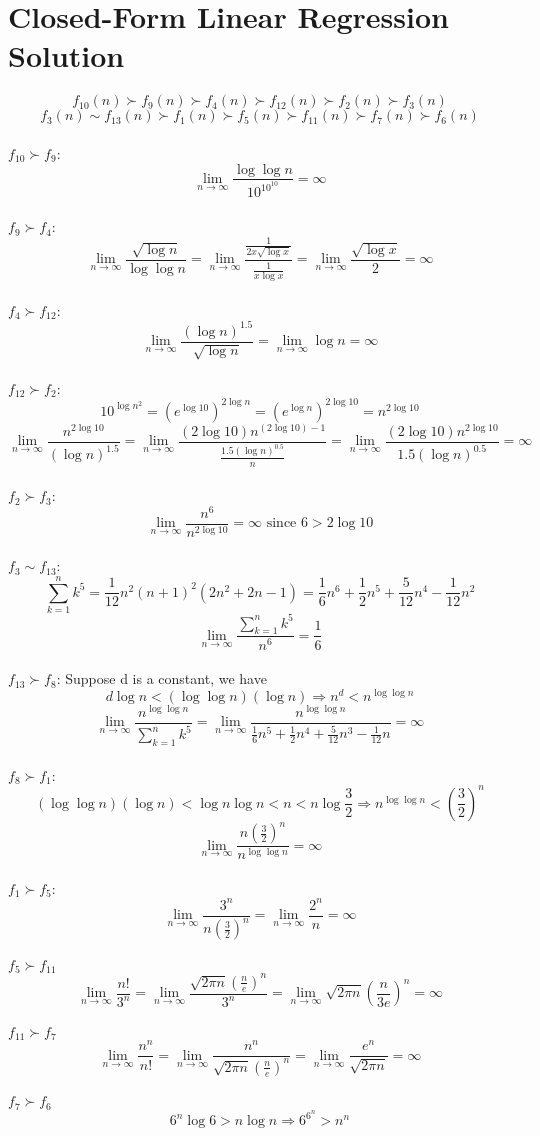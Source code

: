 \documentclass[12pt,a4paper]{article}
\begin{document}
\section{Closed-Form Linear Regression Solution}

\[
    f_{10}(n) \succ f_{9}(n) \succ f_{4}(n) \succ f_{12}(n) \succ f_{2}(n) \succ f_{3}(n)    
\]
\[
    f_{3}(n) \sim f_{13}(n) \succ f_{1}(n) \succ f_{5}(n) \succ f_{11}(n) \succ f_{7}(n) \succ f_{6}(n)
\]
\\
$f_{10} \succ f_{9}$:
\[
    \lim_{n\to\infty} \frac{\log\log n}{10^{10^10}} = \infty
\]
\\
$f_{9} \succ f_{4}$:
\[
    \lim_{n\to\infty} \frac{\sqrt{\log n}}{\log\log n} = \lim_{n\to\infty} \frac{\frac{1}{2x\sqrt{\log x}}}{\frac{1}{x\log x}} = \lim_{n\to\infty} \frac{\sqrt{\log x}}{2} = \infty
\]
\\
$f_{4} \succ f_{12}$:
\[
    \lim_{n\to\infty} \frac{(\log n)^{1.5}}{\sqrt{\log n}} = \lim_{n\to\infty} \log n = \infty
\]
\\
$f_{12} \succ f_{2}$:
\[
    10^{\log n^2} = (e^{\log10})^{2\log n} = (e^{\log n})^{2\log 10}= n^{2\log 10}
\]
\[
    \lim_{n\to\infty} \frac{n^{2\log 10}}{(\log n)^{1.5}} = \lim_{n\to\infty} \frac{(2\log 10) n^{(2\log 10) - 1}}{\frac{1.5(\log n)^{0.5}}{n}} = \lim_{n\to\infty} \frac{(2\log 10) n^{2\log 10}}{1.5(\log n)^{0.5}} = \infty
\]
\\
$f_{2} \succ f_{3}$:
\[
    \lim_{n\to\infty} \frac{n^6}{n^{2\log 10}} = \infty \text{ since } 6 > 2\log 10
\]
\\
$f_{3} \sim f_{13}$:
\[
    \sum_{k = 1}^{n} k^5 = \frac{1}{12} n^2 (n + 1)^2 (2n^2 + 2n - 1) = \frac{1}{6} n^6 + \frac{1}{2} n^5 + \frac{5}{12} n^4 - \frac{1}{12} n^2
\]
\[
    \lim_{n\to\infty} \frac{\sum_{k = 1}^{n} k^5}{n^6} = \frac{1}{6}
\]
\\
$f_{13} \succ f_{8}$:
Suppose d is a constant, we have
\[
    d \log n < (\log \log n) (\log n) \Rightarrow n^{d} < n^{\log\log n}
\]
\[
    \lim_{n\to\infty} \frac{n^{\log\log n}}{\sum_{k = 1}^{n} k^5} = \lim_{n\to\infty} \frac{n^{\log\log n}}{\frac{1}{6} n^5 + \frac{1}{2} n^4 + \frac{5}{12} n^3 - \frac{1}{12} n} = \infty
\]
\\
$f_{8} \succ f_{1}$:
\[
    (\log \log n) (\log n) < \log n \log n < n < n \log \frac{3}{2} \Rightarrow n^{\log\log n} < (\frac{3}{2})^n
\]
\[
    \lim_{n\to\infty} \frac{n(\frac{3}{2})^n}{n^{\log\log n}} = \infty
\]
\\
$f_{1} \succ f_{5}$:
\[
    \lim_{n\to\infty} \frac{3^n}{n(\frac{3}{2})^n} = \lim_{n\to\infty} \frac{2^n}{n} = \infty
\]
\\
$f_{5} \succ f_{11}$
\[
    \lim_{n\to\infty} \frac{n!}{3^n} = \lim_{n\to\infty} \frac{\sqrt{2\pi n}\left(\frac{n}{e}\right)^{n}}{3^n} = \lim_{n\to\infty}  \sqrt{2\pi n}\left(\frac{n}{3e}\right)^{n} = \infty
\]
\\
$f_{11} \succ f_{7}$
\[
    \lim_{n\to\infty} \frac{n^n}{n!} = \lim_{n\to\infty} \frac{n^n}{\sqrt{2\pi n}\left(\frac{n}{e}\right)^{n}} = \lim_{n\to\infty} \frac{e^{n}}{\sqrt{2\pi n}} = \infty
\]
\\
$f_{7} \succ f_{6}$
\[
    6^{n} \log 6 > n \log n \Rightarrow 6^{6^n} > n^{n} 
\]
\end{document}
